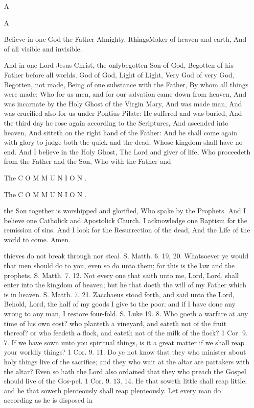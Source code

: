 A

A

Believe in one God the Father Almighty, IthingsMaker of heaven and earth, And of all visible and invisible.

And in one Lord Jesus Christ, the onlybegotten Son of God, Begotten of his Father before all worlds, God of God, Light of Light, Very God of very God, Begotten, not made, Being of one substance with the Father, By whom all things were made: Who for us men, and for our salvation came down from heaven, And was incarnate by the Holy Ghost of the Virgin Mary, And was made man, And was crucified also for us under Pontius Pilate: He suffered and was buried, And the third day he rose again according to the Scriptures, And ascended into heaven, And sitteth on the right hand of the Father: And he shall come again with glory to judge both the quick and the dead; Whose kingdom shall have no end. And I believe in the Holy Ghost, The Lord and giver of life, Who proceedeth from the Father and the Son, Who with the Father and

The C O M M U N I O N .

The C O M M U N I O N .

the Son together is worshipped and glorified, Who spake by the Prophets. And I believe one Catholick and Apostolick Church. I acknowledge one Baptism for the remission of sins. And I look for the Resurrection of the dead, And the Life of the world to come. Amen.

thieves do not break through nor steal. S. Matth. 6. 19, 20. Whatsoever ye would that men should do to you, even so do unto them; for this is the law and the prophets. S. Matth. 7. 12. Not every one that saith unto me, Lord, Lord, shall enter into the kingdom of heaven; but he that doeth the will of my Father which is in heaven. S. Matth. 7. 21. Zacchaeus stood forth, and said unto the Lord, Behold, Lord, the half of my goods I give to the poor; and if I have done any wrong to any man, I restore four-fold. S. Luke 19. 8. Who goeth a warfare at any time of his own cost? who planteth a vineyard, and eateth not of the fruit thereof? or who feedeth a flock, and eateth not of the milk of the flock? 1 Cor. 9. 7. If we have sown unto you spiritual things, is it a great matter if we shall reap your worldly things? 1 Cor. 9. 11. Do ye not know that they who minister about holy things live of the sacrifice; and they who wait at the altar are partakers with the altar? Even so hath the Lord also ordained that they who preach the Gospel should live of the Gos-pel. 1 Cor. 9. 13, 14. He that soweth little shall reap little; and he that soweth plenteously shall reap plenteously. Let every man do according as he is disposed in

